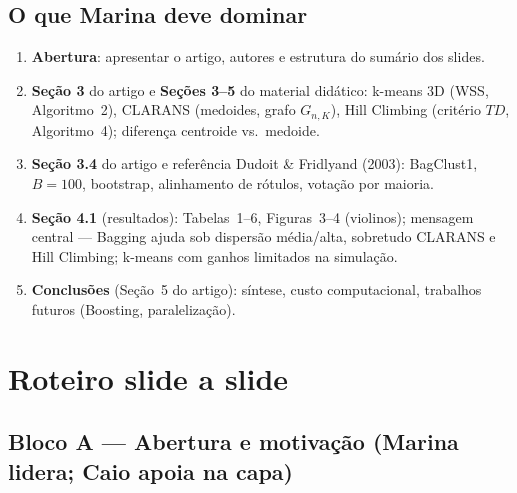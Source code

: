 \documentclass[12pt,a4paper]{article}
\begin{document}
\subsection{O que Marina deve dominar}

\begin{blocomarina}
\begin{enumerate}[leftmargin=*]
  \item \textbf{Abertura}: apresentar o artigo, autores e estrutura do sumário dos slides.
  \item \textbf{Seção 3} do artigo e \textbf{Seções 3--5} do material didático:
        k-means 3D (WSS, Algoritmo~2), CLARANS (medoides, grafo $G_{n,K}$),
        Hill Climbing (critério $TD$, Algoritmo~4); diferença centroide vs.\ medoide.
  \item \textbf{Seção 3.4} do artigo e referência Dudoit \& Fridlyand (2003):
        BagClust1, $B=100$, bootstrap, alinhamento de rótulos, votação por maioria.
  \item \textbf{Seção 4.1} (resultados): Tabelas~1--6, Figuras~3--4 (violinos);
        mensagem central --- Bagging ajuda sob dispersão média/alta, sobretudo
        CLARANS e Hill Climbing; k-means com ganhos limitados na simulação.
  \item \textbf{Conclusões} (Seção~5 do artigo): síntese, custo computacional,
        trabalhos futuros (Boosting, paralelização).
\end{enumerate}
\end{blocomarina}

\section{Roteiro slide a slide}

\subsection{Bloco A --- Abertura e motivação (Marina lidera; Caio apoia na capa)}
\end{document}
